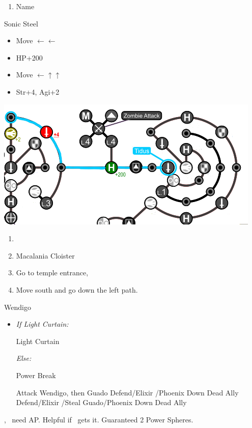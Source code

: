 \begin{enumerate}[resume]
	\item Name \shiva
\end{enumerate}
\begin{equip}
	\begin{itemize}
		\tidusf Sonic Steel
	\end{itemize}
\end{equip}
\begin{spheregrid}
	\begin{itemize}
		\tidusf
		\begin{itemize}
			\item Move $\leftarrow\leftarrow$
			\item HP+200
			\item Move $\leftarrow\uparrow\uparrow$
			\item Str+4, Agi+2
		\end{itemize}
		\includegraphics{graphics/Tidus_Post_Seymour}
	\end{itemize}
\end{spheregrid}
\begin{enumerate}[resume]
	\item \formation{\rikku}{\tidus}{\yuna}
	\item Macalania Cloister
	\item Go to temple entrance, \sd
	\item Move south and go down the left path.
\end{enumerate}
\begin{battle}[18000]{Wendigo}
	\begin{itemize}
		\tidusf Haste \tidus
		\tidusf Switch Weapon to Brotherhood
		\tidusf Attack Guado B (Top One)
		\item \textit{If Light Curtain:}
		      \begin{itemize}
			      \rikkuf Light Curtain \tidus
		      \end{itemize}
		      \textit{Else:}
		      \begin{itemize}
			      \switch{\rikku}{\auron}
			      \auronf Power Break
		      \end{itemize}
		      \tidusf Attack Wendigo, then Guado
		      \yunaf Defend/Elixir \tidus/Phoenix Down Dead Ally
		      \rikkuf Defend/Elixir \tidus/Steal Guado/Phoenix Down Dead Ally
		      \switch{\yuna}{\lulu}
	\end{itemize}
	\yuna, \tidus\ need AP. Helpful if \lulu\ gets it.
	Guaranteed 2 Power Spheres.
\end{battle}
